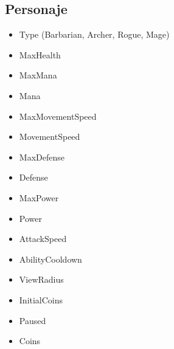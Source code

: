 \subsection{Personaje}
\begin{itemize}
    \item Type (Barbarian, Archer, Rogue, Mage)
    \item MaxHealth
    \item MaxMana
    \item Mana
    \item MaxMovementSpeed
    \item MovementSpeed
    \item MaxDefense
    \item Defense
    \item MaxPower
    \item Power
    \item AttackSpeed
    \item AbilityCooldown
    \item ViewRadius
    \item InitialCoins
    \item Paused
    \item Coins
\end{itemize}